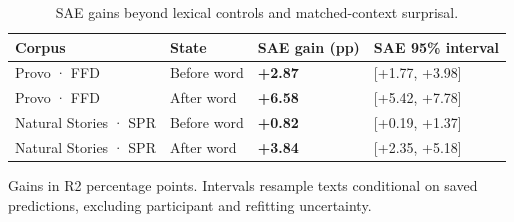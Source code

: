 \begin{table}[t]
\caption{SAE gains beyond lexical controls and matched-context surprisal.}
\label{tab:sae-prediction}
\begin{tabular}{llll}
\toprule
Corpus & State & SAE gain (pp) & SAE 95\% interval \\
\midrule
Provo · FFD & Before word & \textbf{+2.87} & [+1.77, +3.98] \\
Provo · FFD & After word & \textbf{+6.58} & [+5.42, +7.78] \\
Natural Stories · SPR & Before word & \textbf{+0.82} & [+0.19, +1.37] \\
Natural Stories · SPR & After word & \textbf{+3.84} & [+2.35, +5.18] \\
\bottomrule
\end{tabular}
\par\smallskip
\begin{minipage}{\linewidth}\footnotesize
Gains in R2 percentage points. Intervals resample texts conditional on saved predictions, excluding participant and refitting uncertainty.
\end{minipage}
\end{table}
